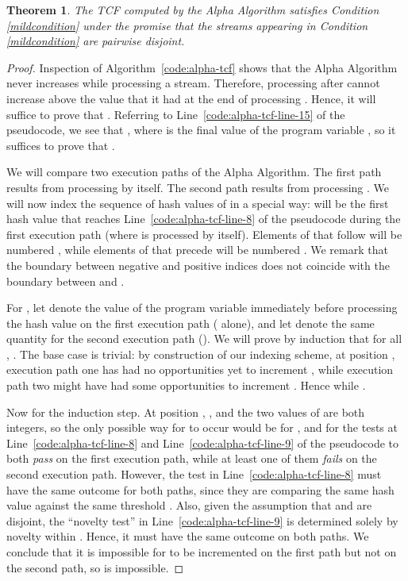 \documentclass{article}
\newtheorem{theorem}{Theorem}[section]
\begin{document}
\begin{theorem}
The TCF computed by the Alpha Algorithm satisfies Condition \ref{mildcondition} under the promise that the streams  appearing
in Condition \ref{mildcondition} are pairwise disjoint.
\end{theorem}
\begin{proof}
Inspection of Algorithm~\ref{code:alpha-tcf} shows that the Alpha Algorithm never increases  while processing a stream.
Therefore, processing  after  cannot increase  above the value that it had at the end of processing
. Hence, it will suffice to prove that . Referring to Line~\ref{code:alpha-tcf-line-15} of the pseudocode, we see
that , where  is the final value of the program variable , so it suffices to
prove that . 

We will compare two execution paths of the Alpha Algorithm. The first path results from processing
 by itself. The second path results from processing . We will now
index the sequence of hash values of  in a special way:  will be the
first hash value that reaches Line~\ref{code:alpha-tcf-line-8} of the pseudocode during the first execution path (where  is
processed by itself). Elements of  that follow  will be numbered , while elements
of  that precede  will be numbered . We remark that
the boundary between negative and positive indices does not coincide with the boundary between  and .

For , let
 denote the value of the program variable  immediately before processing the hash value
 on the first execution path ( alone), and let  denote the same quantity for the second
execution path (). We will prove by induction that for all , .
The base case is trivial: by construction of our indexing scheme, at position , execution
path one has had no opportunities yet to increment , while execution path two might have had some opportunities to increment .
Hence  while . 

Now for the induction step. At position , , and the two values of 
are both integers, so the only possible way for  to occur would be for , and for the
tests at
Line~\ref{code:alpha-tcf-line-8}
and
Line~\ref{code:alpha-tcf-line-9} of the pseudocode to both {\em pass} on the first execution path, while at least one of them
{\em fails} on the second execution path. However, the test in Line~\ref{code:alpha-tcf-line-8} must have the same outcome for both paths,
since they are comparing the same hash value  against the same threshold . Also, given the
assumption that  and  are disjoint, the ``novelty test'' in Line~\ref{code:alpha-tcf-line-9} is
determined solely by novelty within
. Hence, it must have the same outcome on both paths. We conclude that it is impossible for  to be incremented on the
first path but not on the second path, so  is impossible.
\end{proof}
\end{document}
